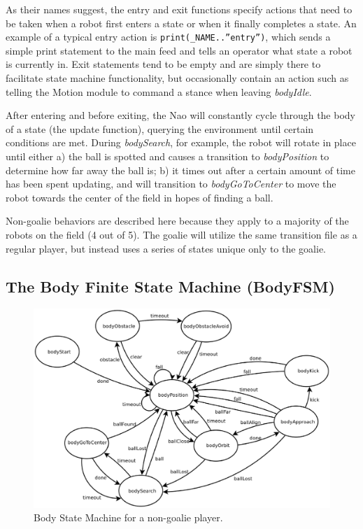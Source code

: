 \documentclass{article}
\begin{document}
	As their names suggest, the entry and exit functions specify actions that need to be taken when a robot first enters a state or when it finally completes a state. An example of a typical entry action is \texttt{print(\_NAME..”entry”)}, which sends a simple print statement to the main feed and tells an operator what state a robot is currently in. Exit statements tend to be empty and are simply there to facilitate state machine functionality, but occasionally contain an action such as telling the Motion module to command a stance when leaving \textit{bodyIdle}.

	After entering and before exiting, the Nao will constantly cycle through the body of a state (the update function), querying the environment until certain conditions are met. During \textit{bodySearch}, for example, the robot will rotate in place until either a) the ball is spotted and causes a transition to \textit{bodyPosition} to determine how far away the ball is; b) it times out after a certain amount of time has been spent updating, and will transition to \textit{bodyGoToCenter} to move the robot towards the center of the field in hopes of finding a ball.

	Non-goalie behaviors are described here because they apply to a majority of the robots on the field (4 out of 5). The goalie will utilize the same transition file as a regular player, but instead uses a series of states unique only to the goalie.

	\subsection{The Body Finite State Machine (BodyFSM)}
		\begin{figure}[H]
			\centering
			\includegraphics[width=\textwidth]{figures/BodyFSM.eps}
			\caption{Body State Machine for a non-goalie player.}
			\label{fig:bodyfsm}
		\end{figure}
		
\end{document}
